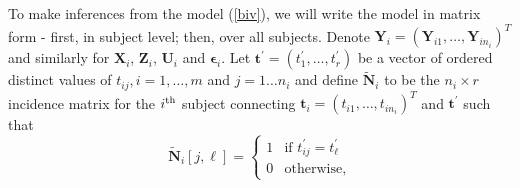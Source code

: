 \documentclass[article,lineno]{biometrika}
\begin{document}
To make inferences from the model (\ref{biv}), we will  write the model in matrix form -  first, in subject level; then, over all subjects.  
Denote $\bm Y_{i} = (\bm Y_{i1}, \dots, \bm Y_{in_i})^T$ and similarly for $\bm X_i$, $\bm Z_i$, $\bm U_i$ and $\bm \epsilon_i$. 
Let 
 $
\bm t^\prime = (t_{1}^\prime, \dots, t_r^\prime)
 $
be a vector of ordered distinct values of $t_{ij}, i = 1, \dots, m$ and $j = 1\dots n_i$ and
define
 $\bm {\tilde N}_i$ to be the $n_i \times r$ incidence matrix for the $i^{\rm th}$ subject connecting 
 $
 \bm t_i = (t_{i1}, \dots, t_{in_i})^T 
 $
 and
 $\bm t^\prime$ such that
 $$
\bm {\tilde N}_i [j, \ell] =
\begin{cases}
1 & \text{if } t_{ij}^\prime = t_\ell^\prime \\
0 & \text{otherwise},
\end{cases}
$$
\end{document}
